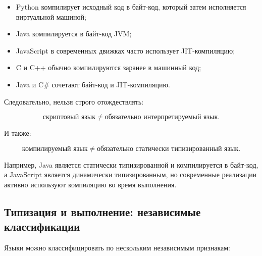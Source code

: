 \documentclass[12pt,a4paper]{article}
\begin{document}
\begin{itemize}
    \item Python компилирует исходный код в байт-код, который затем исполняется
    виртуальной машиной;
    \item Java компилируется в байт-код JVM;
    \item JavaScript в современных движках часто использует JIT-компиляцию;
    \item C и C++ обычно компилируются заранее в машинный код;
    \item Java и C\# сочетают байт-код и JIT-компиляцию.
\end{itemize}

Следовательно, нельзя строго отождествлять:

\[
\text{скриптовый язык} \neq \text{обязательно интерпретируемый язык}.
\]

И также:

\[
\text{компилируемый язык} \neq \text{обязательно статически типизированный язык}.
\]

Например, Java является статически типизированной и компилируется в байт-код, а
JavaScript является динамически типизированным, но современные реализации активно
используют компиляцию во время выполнения.

\subsection{Типизация и выполнение: независимые классификации}

Языки можно классифицировать по нескольким независимым признакам:
\end{document}
